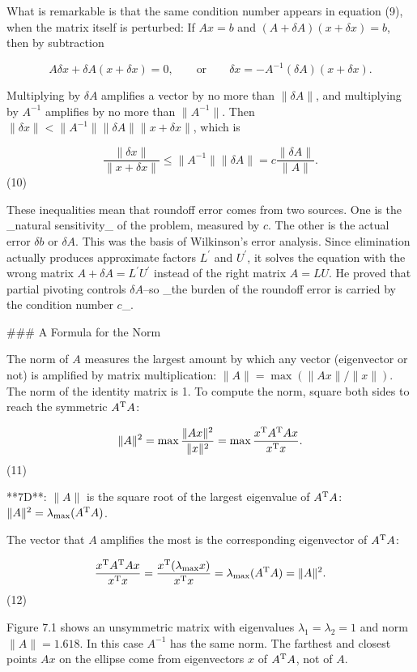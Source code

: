What is remarkable is that the same condition number appears in equation (9), when the matrix itself is perturbed: If \(Ax=b\) and \((A+\delta A)(x+\delta x)=b\), then by subtraction

\[A\delta x+\delta A(x+\delta x)=0,\qquad\mbox{or}\qquad\delta x=-A^{-1}(\delta A )(x+\delta x).\]

Multiplying by \(\delta A\) amplifies a vector by no more than \(\|\delta A\|\), and multiplying by \(A^{-1}\) amplifies by no more than \(\|A^{-1}\|\). Then \(\|\delta x\|<\|A^{-1}\|\|\delta A\|\|x+\delta x\|\), which is

\[\frac{\|\delta x\|}{\|x+\delta x\|}\leq\|A^{-1}\|\|\delta A\|=c\frac{\|\delta A \|}{\|A\|}.\] (10)

These inequalities mean that roundoff error comes from two sources. One is the _natural sensitivity_ of the problem, measured by \(c\). The other is the actual error \(\delta b\) or \(\delta A\). This was the basis of Wilkinson's error analysis. Since elimination actually produces approximate factors \(L^{\prime}\) and \(U^{\prime}\), it solves the equation with the wrong matrix \(A+\delta A=L^{\prime}U^{\prime}\) instead of the right matrix \(A=LU\). He proved that partial pivoting controls \(\delta A\)--so _the burden of the roundoff error is carried by the condition number \(c\)_.

### A Formula for the Norm

The norm of \(A\) measures the largest amount by which any vector (eigenvector or not) is amplified by matrix multiplication: \(\|A\|=\max(\|Ax\|/\|x\|)\). The norm of the identity matrix is 1. To compute the norm, square both sides to reach the symmetric \(A^{\rm T}A\):

\[\|A\|^{2}=\max\frac{\|Ax\|^{2}}{\|x\|^{2}}=\max\frac{x^{\rm T}A^{\rm T}Ax}{x^{ \rm T}x}.\] (11)

**7D**: \(\|A\|\) is the square root of the largest eigenvalue of \(A^{\rm T}A\): \(\|A\|^{2}=\lambda_{\max}(A^{\rm T}A)\).

The vector that \(A\) amplifies the most is the corresponding eigenvector of \(A^{\rm T}A\):

\[\frac{x^{\rm T}A^{\rm T}Ax}{x^{\rm T}x}=\frac{x^{\rm T}(\lambda_{\max}x)}{x^{ \rm T}x}=\lambda_{\max}(A^{\rm T}A)=\|A\|^{2}.\] (12)

Figure 7.1 shows an unsymmetric matrix with eigenvalues \(\lambda_{1}=\lambda_{2}=1\) and norm \(\|A\|=1.618\). In this case \(A^{-1}\) has the same norm. The farthest and closest points \(Ax\) on the ellipse come from eigenvectors \(x\) of \(A^{\rm T}A\), not of \(A\).

